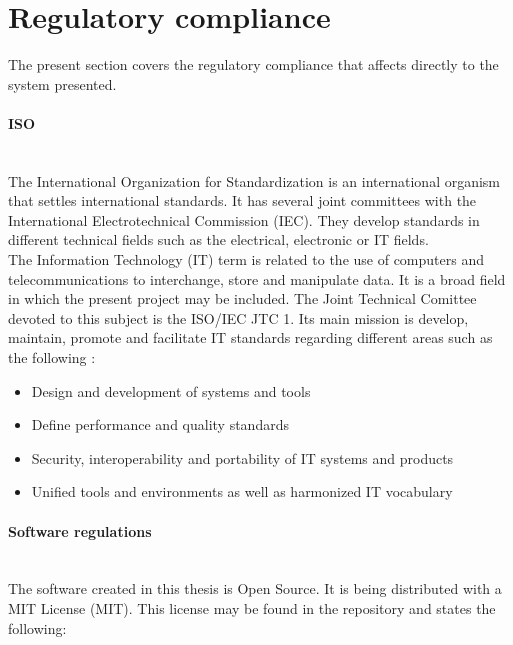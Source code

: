 \section {Regulatory compliance}
The present section covers the regulatory compliance that affects directly to the system presented. 

	\paragraph{ISO}\mbox{}\\

	The International Organization for Standardization is an international organism that settles international standards. 
	It has several joint committees with the International Electrotechnical Commission (IEC). 
	They develop standards in different technical fields such as the electrical, electronic or IT fields. 
	\\

	The Information Technology (IT) term is related to the use of computers and telecommunications to interchange, store and manipulate data.  
	It is a broad field in which the present project may be included.
	The Joint Technical Comittee devoted to this subject is the ISO/IEC JTC 1. 
	Its main mission is develop, maintain, promote and facilitate IT standards regarding different areas such as the following : 
	\begin{itemize}
		\item{Design and development of systems and tools}
		\item{Define performance and quality standards}
		\item{Security, interoperability and portability of IT systems and products}
		\item{Unified tools and environments as well as harmonized IT vocabulary}
	\end{itemize}


	\paragraph{Software regulations}\mbox{}\\




	The software created in this thesis is Open Source. 
	It is being distributed with a MIT License (MIT). 
	This license may be found in the repository and states the following: \\

